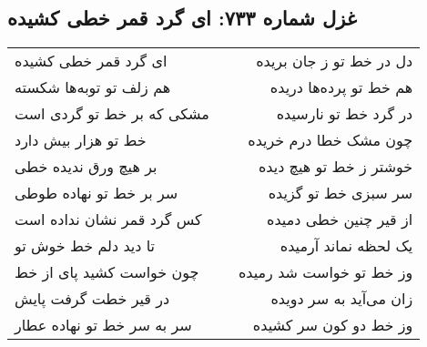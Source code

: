 \begin{center}
\section*{غزل شماره ۷۳۳: ای گرد قمر خطی کشیده}
\label{sec:733}
\begin{longtable}{l p{0.5cm} r}
ای گرد قمر خطی کشیده
&&
دل در خط تو ز جان بریده
\\
هم زلف تو توبه‌ها شکسته
&&
هم خط تو پرده‌ها دریده
\\
مشکی که بر خط تو گردی است
&&
در گرد خط تو نارسیده
\\
خط تو هزار بیش دارد
&&
چون مشک خطا درم خریده
\\
بر هیچ ورق ندیده خطی
&&
خوشتر ز خط تو هیچ دیده
\\
سر بر خط تو نهاده طوطی
&&
سر سبزی خط تو گزیده
\\
کس گرد قمر نشان نداده است
&&
از قیر چنین خطی دمیده
\\
تا دید دلم خط خوش تو
&&
یک لحظه نماند آرمیده
\\
چون خواست کشید پای از خط
&&
وز خط تو خواست شد رمیده
\\
در قیر خطت گرفت پایش
&&
زان می‌آید به سر دویده
\\
سر به سر خط تو نهاده عطار
&&
وز خط دو کون سر کشیده
\\
\end{longtable}
\end{center}
